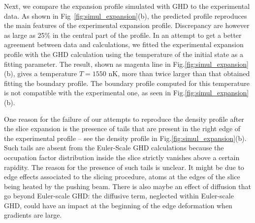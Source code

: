 		
		Next, we compare the expansion profile simulated with GHD to the experimental data.
		As shown in Fig~\ref{fig:simul_expansion}(b), the  predicted profile reproduces the main features of the  experimental expansion profile. Discrepancy are however as large as 25\% in the central part of the profile. In an attempt to get a better agreement between data and calculations, we fitted the experimental expansion profile with the GHD calculation using the temperature of the initial state as a fitting parameter. The result, shown as magenta line in Fig.\ref{fig:simul_expansion} (b),
    gives a temperature  $T=1550$ nK,  more than twice
		larger than that  obtained fitting the boundary profile. The boundary profile computed for 
		this temperature is not compatible with  the experimental one, as seen in Fig.\ref{fig:simul_expansion}(b). %
		
		
		One reason for the failure of our attempts to 
		reproduce the density profile after the 
		slice expansion is the presence of tails that 
		are present in the right edge of the experimental profile -- see the 
		density profile in Fig.\ref{fig:simul_expansion}(b).
		Such tails are absent from the Euler-Scale GHD calculations because the occupation factor distribution inside the slice strictly vanishes above a certain rapidity. The reason for the presence of such tails is unclear. It might be due to edge effects associated to the slicing procedure, atoms at the edges of the slice being heated by the pushing beam. There is also maybe an effect of diffusion that go beyond Euler-scale GHD: the diffusive term, neglected within Euler-scale GHD, could have an impact  at the beginning of the edge deformation when gradients are large. 
		
		
   		
	
